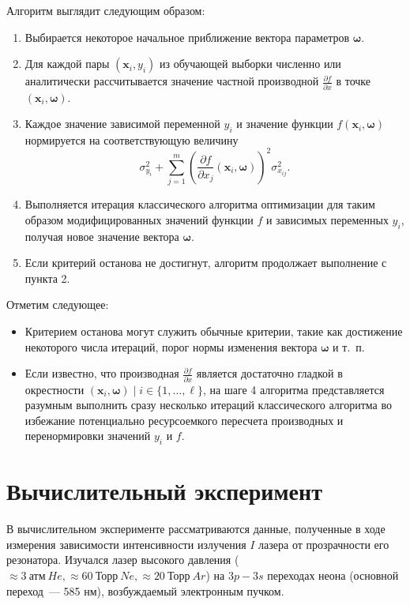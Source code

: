 \documentclass[tikz,10pt,a4paper]{article}
\newcommand{\bomega}{\boldsymbol{\omega}}
\begin{document}
Алгоритм выглядит следующим образом:
\begin{enumerate}
  \item Выбирается некоторое начальное приближение вектора параметров $\bomega$.
  \item Для каждой пары $(\mathbf{x}_i, y_i)$ из обучающей выборки численно или
	аналитически рассчитывается значение частной производной
	$\frac{\partial f}{\partial x}$ в точке $(\mathbf{x}_i, \bomega)$.
  \item Каждое значение зависимой переменной $y_i$ и значение функции $f(\mathbf{x}_i, \bomega)$
	нормируется на соответствующую величину
	\[
	  \sigma_{y_i}^2 + \sum_{j = 1}^m (\frac{\partial f}{\partial x_j}(\mathbf{x}_i, \bomega))^2 \sigma^2_{x_{ij}}.
	\]
  \item Выполняется итерация классического алгоритма оптимизации для таким образом
	модифицированных значений функции $f$ и зависимых переменных $y_i$, получая
	новое значение вектора $\bomega$.
  \item Если критерий останова не достигнут, алгоритм продолжает выполнение с пункта 2.
\end{enumerate}

Отметим следующее:
\begin{itemize}
  \item Критерием останова могут служить обычные критерии, такие как достижение некоторого
    числа итераций, порог нормы изменения вектора $\bomega$ и т.~п.
  \item Если известно, что производная $\frac{\partial f}{\partial x}$ является достаточно гладкой
	в окрестности $(\mathbf{x}_i, \bomega) \mid i \in \{ 1, \dots, \ell \}$, на шаге
	4 алгоритма представляется разумным выполнить сразу несколько итераций
	классического алгоритма во избежание потенциально ресурсоемкого пересчета производных и
	перенормировки значений $y_i$ и $f$.
\end{itemize}

\section{Вычислительный эксперимент}

В вычислительном эксперименте рассматриваются данные, полученные в ходе измерения
зависимости интенсивности излучения $I$ лазера от прозрачности его резонатора.
Изучался лазер высокого давления ($\approx 3\ \text{атм}\ He, \approx 60\ \text{Торр}\ Ne, \approx 20\ \text{Торр}\ Ar$) на
$3p-3s$ переходах неона (основной переход~--- 585 нм), возбуждаемый электронным пучком\cite{alexandrov1991kinetics}.
\end{document}
